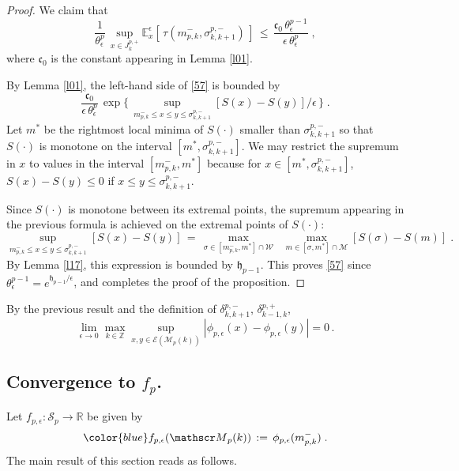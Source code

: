 \documentclass[reqno]{amsart}
\theoremstyle{plain}
\theoremstyle{definition}
\newcommand{\mc}[1]{{\mathcal #1}}
\newcommand{\mf}[1]{{\mathfrak #1}}
\newcommand{\bb}[1]{{\mathbb #1}}
\newcommand{\ms}[1]{{\mathscr #1}}
\newcounter{as}[section]
\newcommand{\<}{\langle}
\renewcommand{\>}{\rangle}
\begin{document}
\begin{proof}
We claim that
\begin{equation}
\label{57}
\frac{1}{\theta^p_\epsilon}\, \sup_{x\in J^{p,+}_{k}} 
\bb E^\epsilon_{x} [\, \tau (m^{-}_{p,k}, \sigma^{p,-}_{k,k+1}) \, ]
\,\le\, \frac{\mf c_0 \, \theta^{p-1}_\epsilon}{\epsilon\,
\theta^p_\epsilon} \;,
\end{equation}
where $\mf c_0$ is the constant appearing in Lemma \ref{l01}.

By Lemma \ref{l01}, the left-hand side of \eqref{57} is bounded by
\begin{equation*}
\frac{\mf c_0 }{\epsilon\, \theta^p_\epsilon}\,
\exp\Big\{ \,
\sup_{m^{-}_{p,k} \le x \le y \le \sigma^{p,-}_{k,k+1}}
[S(x)-S(y)]/\epsilon\,\Big\}\;.
\end{equation*}
Let $m^*$ be the rightmost local minima of $S(\cdot)$ smaller than
$\sigma^{p,-}_{k,k+1}$ so that $S(\cdot)$ is monotone on the interval
$[m^*, \sigma^{p,-}_{k,k+1}]$. We may restrict the supremum in $x$ to
values in the interval $[m^{-}_{p,k}, m^*]$ because for
$x\in [m^*, \sigma^{p,-}_{k,k+1}]$, $S(x)-S(y)\le 0$ if
$x\le y\le \sigma^{p,-}_{k,k+1}$.

Since $S(\cdot)$ is monotone between its extremal points, the supremum
appearing in the previous formula is achieved on the extremal points
of $S(\cdot)$:
\begin{equation*}
\sup_{m^{-}_{p,k} \le x \le y \le \sigma^{p,-}_{k,k+1}}
[S(x)-S(y)] \,=\, \max_{\sigma \in [m^{-}_{p,k}, m^*] \cap \mc W}
\;\; \max_{m\in [\sigma, m^*] \cap \mc M} [S(\sigma)-S(m)]\;.
\end{equation*}
By Lemma \ref{l17}, this expression is bounded by $\mf h_{p-1}$. This
proves \eqref{57} since
$\theta^{p-1}_\epsilon = e^{\mf h_{p-1} /\epsilon}$, and completes the
proof of the proposition.
\end{proof}

By the previous result and the definition of $\delta^{p,-}_{k,k+1}$,
$\delta^{p,+}_{k-1,k}$, 
\begin{equation}
\label{05p}
\lim_{\epsilon \to 0} \max_{k\in \bb Z}
\sup_{x,y \in \ms E(\ms M_p(k))}
|\phi_{p,\epsilon}(x) - \phi_{p,\epsilon}(y)| = 0\,.
\end{equation}

\subsection*{Convergence to $f_{p}$.}

Let $f_{p,\epsilon} \colon \ms S_p \to \bb R$ be given by
\begin{equation}
\label{70}
{\color{blue} f_{p,\epsilon} (\ms M_p(k))} \,:=\,
\phi_{p,\epsilon}(m^{-}_{p,k})\;.
\end{equation}
The main result of this section reads as follows.
\end{document}
